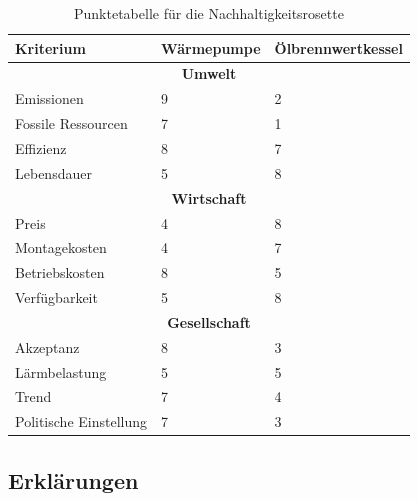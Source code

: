 \begin{table}
\begin{center}
\begin{tabular}[c]{|p{}|p{}|p{}|}

  \hline
  \textbf{Kriterium} &
  \textbf{Wärmepumpe} &
  \textbf{Ölbrennwertkessel} \\ \hline

  \multicolumn{3}{|c|}{\textbf{Umwelt}} \\ \hline
  
  Emissionen
  & 9 & 2 \\
  Fossile Ressourcen
  & 7 & 1 \\
  Effizienz
  & 8 & 7 \\
  Lebensdauer
  & 5 & 8 \\
  \hline
  
  \multicolumn{3}{|c|}{\textbf{Wirtschaft}} \\ \hline
  
  Preis
  & 4 & 8 \\
  Montagekosten
  & 4 & 7 \\
  Betriebskosten
  & 8 & 5 \\
  Verfügbarkeit
  & 5 & 8 \\
  \hline

  \multicolumn{3}{|c|}{\textbf{Gesellschaft}} \\ \hline

  Akzeptanz
  & 8 & 3 \\
  Lärmbelastung
  & 5 & 5 \\
  Trend
  & 7 & 4 \\
  Politische Einstellung
  & 7 & 3 \\
  \hline

\end{tabular}
\end{center}
\label{rosette:score}
\caption{Punktetabelle für die Nachhaltigkeitsrosette}
\end{table}


\subsection{Erklärungen}

